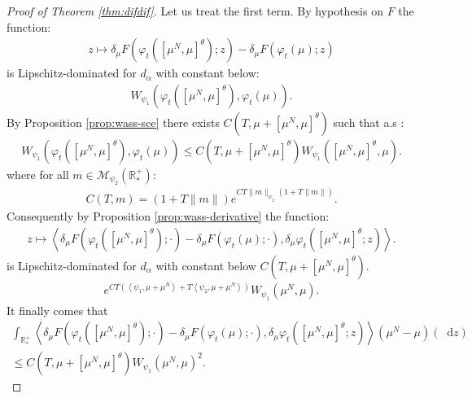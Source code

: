 \documentclass[11pt,a4paper]{article}
\newcommand{\RRP}{\mathbb{R}^+_*}
\newcommand{\MC}{\mathcal{M}}
\newcommand{\brac}[1]{\left\langle#1\right\rangle}
\newcommand{\dd}{\mathop{}\!\mathrm{d}}
\begin{document}
\begin{proof}[Proof of Theorem \ref{thm:difdif}]
    Let us treat the first term. By hypothesis on $F$ the function:
    \begin{align*}
        z \mapsto \delta_\mu F\left(\varphi_t \left(\left[\mu^N,\mu \right]^\theta\right);z \right)- \delta_\mu F\left(\varphi_t \left(\mu\right);z \right)
    \end{align*}
    is Lipschitz-dominated for $d_\alpha$ with constant below:
    \begin{align*}
        W_{\psi_1}\left(\varphi_t \left(\left[\mu^N,\mu \right]^\theta\right), \varphi_t \left(\mu \right)\right).
    \end{align*}
    By Proposition \ref{prop:wass-sce} there exists $C(T,\mu + \left[\mu^N,\mu \right]^\theta)$ such that a.s :
    \begin{align*}
        W_{\psi_1}\left(\varphi_t \left(\left[\mu^N,\mu \right]^\theta\right), \varphi_t \left(\mu \right)\right) \leq C(T,\mu + \left[\mu^N,\mu \right]^\theta)W_{\psi_1}\left( \left[\mu^N,\mu \right]^\theta , \mu\right).
    \end{align*}
    where for all $m \in \MC_{\psi_2}(\RRP)$:
    \begin{align*}
        C(T,m) = \left( 1 + T\|m\|\right)e^{CT\|m\|_{\psi_2}\left(1 + T \|m\| \right)}.
    \end{align*}
    Consequently by Proposition \ref{prop:wass-derivative} the function: 
    \begin{align*}
         z \mapsto \brac{\delta_\mu F\left(\varphi_t \left(\left[\mu^N,\mu \right]^\theta\right);\cdot \right)- \delta_\mu F\left(\varphi_t \left(\mu\right);\cdot \right), \delta_\mu \varphi_t\left(\left[\mu^N,\mu \right]^\theta;z \right)}.
    \end{align*}
    is Lipschitz-dominated for $d_\alpha$ with constant below $C(T, \mu + \left[\mu^N,\mu \right]^\theta)$.
    \begin{align*}
        e^{CT\left(\brac{\psi_1,\mu + \mu^N} + T\brac{\psi_2,\mu + \mu^N}\right)}W_{\psi_1}\left( \mu^N , \mu\right).
    \end{align*}
    It finally comes that 
    \begin{multline*}
        \int_{\RRP} \brac{\delta_\mu F\left(\varphi_t \left(\left[\mu^N,\mu \right]^\theta\right);\cdot \right)- \delta_\mu F\left(\varphi_t \left(\mu\right);\cdot \right), \delta_\mu \varphi_t\left(\left[\mu^N,\mu \right]^\theta;z \right)} \left(\mu^N - \mu\right)(\dd z) \\
        \leq C(T, \mu + \left[\mu^N,\mu \right]^\theta) W_{\psi_1}\left( \mu^N , \mu\right)^2.

\end{multline*}
\end{proof}
\end{document}
